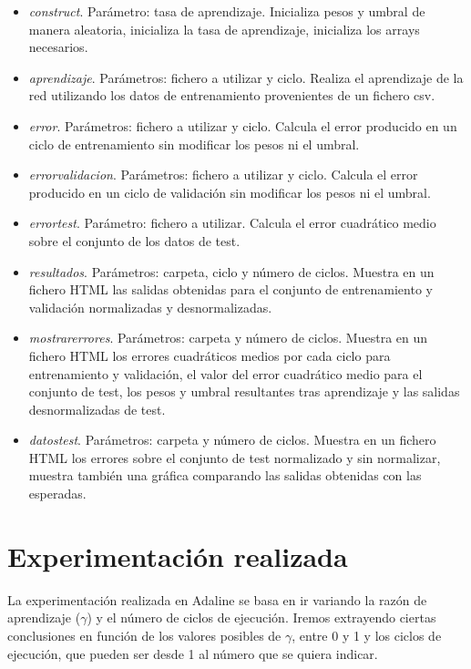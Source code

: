 \documentclass[11pt,spanish,listoffigures,listoftables]{workluis}
\begin{document}
\begin{itemize}
\item \textit{construct}. Parámetro: tasa de aprendizaje. Inicializa pesos y umbral de manera aleatoria, inicializa la tasa de aprendizaje, inicializa los arrays necesarios.
\item \textit{aprendizaje}. Parámetros: fichero a utilizar y ciclo. Realiza el aprendizaje de la red utilizando los datos de entrenamiento provenientes de un fichero csv.
\item \textit{error}. Parámetros: fichero a utilizar y ciclo. Calcula el error producido en un ciclo de entrenamiento sin modificar los pesos ni el umbral.
\item \textit{errorvalidacion}. Parámetros: fichero a utilizar y ciclo. Calcula el error producido en un ciclo de validación sin modificar los pesos ni el umbral.
\item \textit{errortest}. Parámetro: fichero a utilizar. Calcula el error cuadrático medio sobre el conjunto de los datos de test.
\item \textit{resultados}. Parámetros: carpeta, ciclo y número de ciclos. Muestra en un fichero HTML las salidas obtenidas para el conjunto de entrenamiento y validación normalizadas y desnormalizadas.
\item \textit{mostrarerrores}. Parámetros: carpeta y número de ciclos. Muestra en un fichero HTML los errores cuadráticos medios por cada ciclo para entrenamiento y validación, el valor del error cuadrático medio para el conjunto de test, los pesos y umbral resultantes tras aprendizaje y las salidas desnormalizadas de test.
\item \textit{datostest}. Parámetros: carpeta y número de ciclos. Muestra en un fichero HTML los errores sobre el conjunto de test normalizado y sin normalizar, muestra también una gráfica comparando las salidas obtenidas con las esperadas.
\end{itemize}

\section{Experimentación realizada}

\par La experimentación realizada en Adaline se basa en ir variando la razón de aprendizaje ($\gamma$) y el número de ciclos de ejecución. Iremos extrayendo ciertas conclusiones en función de los valores posibles de $\gamma$, entre 0 y 1 y los ciclos de ejecución, que pueden ser desde 1 al número que se quiera indicar.
\end{document}
